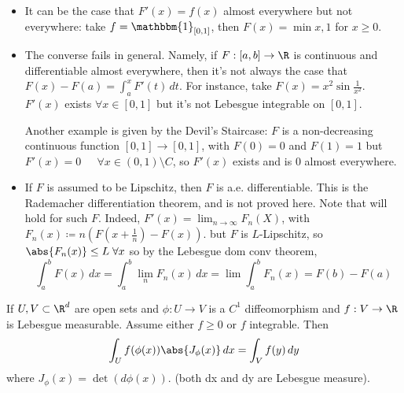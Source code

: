 \documentclass{article}
\newcommand{\1}[1]{\mathbbm{1}_{#1}}
\begin{document}
\begin{remark}
    \begin{itemize}
        \item It can be the case that $F'(x) = f(x)$ almost everywhere but not everywhere: take $f = \1{[0, 1]}$, then $F(x) = \min{x, 1}$ for $x \geq 0$.

        \item The converse fails in general.
            Namely, if $F:[a, b] \to \R$ is continuous and differentiable almost everywhere, then it's not always the case that $F(x) - F(a) = \int_a^x F'(t) \, dt$. %
            For instance, take $F(x) = x^2 \sin{\frac{1}{x^2}}$.
            $F'(x)$ exists $\forall x \in [0, 1]$ but it's not Lebesgue integrable on $[0, 1]$.

            Another example is given by the Devil's Staircase:
            $F$ is a non-decreasing continuous function $[0, 1] \to [0, 1]$, with $F(0) = 0$ and $F(1) = 1$ but $F'(x) = 0 \;\, \quad \forall x \in (0, 1) \setminus C$, so $F'(x)$ exists and is $0$ almost everywhere.

        \item If $F$ is assumed to be Lipschitz, then $F$ is a.e. differentiable. This is the Rademacher differentiation theorem, and is not proved here.
            Note that %
            will hold for such $F$. Indeed, $F'(x) = \lim_{n \to \infty} F_n(X)$, with $F_n(x) \coloneqq n(F(x + \frac{1}{n}) - F(x))$.
            but $F$ is $L$-Lipschitz, so $\abs{F_n(x)} \leq L \; \forall x$ so by the Lebesgue dom conv theorem,
            \begin{equation*}
                \int_a^b F(x) \, dx = \int_a^b \lim_n F_n(x) \, dx = \lim \int_a^b F_n(x) = F(b) - F(a)
            \end{equation*}
    \end{itemize}
\end{remark}

\begin{thm}If $U, V \subset \R^d$ are open sets and $\phi:U \to V$ is a $C^1$ diffeomorphism and $f: V \to \R$ is Lebesgue measurable. Assume either $f \geq 0$ or $f$ integrable. Then
    \begin{equation*}
        \int_U f(\phi(x)) \abs{J_\phi(x)} \, dx = \int_V f(y) \, dy
    \end{equation*}
    where $J_\phi(x) = \det(d \phi(x))$.
    (both dx and dy are Lebesgue measure).
\end{thm}
\end{document}
